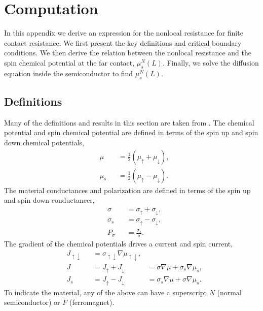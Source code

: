 \appendix
\section{Computation}

In this appendix we derive an expression for
the nonlocal resistance for finite contact resistance.
We first present the key definitions and critical boundary conditions.
We then derive the relation between the nonlocal resistance
and the spin chemical potential at the far contact, $μ_s^N (L)$.
Finally, we solve the diffusion equation inside the semiconductor to find $μ_s^N (L)$.

\subsection{Definitions}

Many of the definitions and results in this section are taken from
\cite{ActaPhysicaSlovaca.57.4_5.565-907}.
The chemical potential and spin chemical potential are defined in terms
of the spin up and spin down chemical potentials,
\begin{subequations}
  \label{eq:potentials}
  \begin{alignat}{2}
    & μ   && = \frac{1}{2} \left( μ_↑ + μ_↓ \right) , \\
    & μ_s && = \frac{1}{2} \left( μ_↑ - μ_↓ \right) .
  \end{alignat}
\end{subequations}
The material conductances and polarization are defined in terms
of the spin up and spin down conductances,
\begin{subequations}
  \label{eq:conductances}
  \begin{alignat}{2}
    & σ   && = σ_↑ + σ_↓ , \\
    & σ_s && = σ_↑ - σ_↓ , \\
    & P_σ && = \frac{σ_s}{σ} .
  \end{alignat}
\end{subequations}
The gradient of the chemical potentials drives a current and spin current,
\begin{subequations}
  \label{eq:currents}
  \begin{alignat}{3}
    & J_{↑↓} && = σ_{↑↓} ∇μ_{↑↓} , \\
    \label{eq:currents.current}
    & J      && = J_↑ + J_↓      & = σ   ∇μ + σ_s ∇μ_s , \\
    \label{eq:currents.spincurrent}
    & J_s    && = J_↑ - J_↓      & = σ_s ∇μ + σ   ∇μ_s .
  \end{alignat}
\end{subequations}
To indicate the material, any of the above can have a superscript
$N$ (normal semiconductor) or $F$ (ferromagnet).

